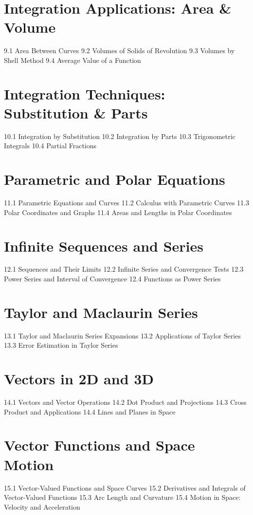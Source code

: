 \section{Integration Applications: Area \& Volume}
9.1 Area Between Curves
9.2 Volumes of Solids of Revolution
9.3 Volumes by Shell Method
9.4 Average Value of a Function
\section{Integration Techniques: Substitution \& Parts}
10.1 Integration by Substitution
10.2 Integration by Parts
10.3 Trigonometric Integrals
10.4 Partial Fractions
\section{Parametric and Polar Equations}
11.1 Parametric Equations and Curves
11.2 Calculus with Parametric Curves
11.3 Polar Coordinates and Graphs
11.4 Areas and Lengths in Polar Coordinates
\section{Infinite Sequences and Series}
12.1 Sequences and Their Limits
12.2 Infinite Series and Convergence Tests
12.3 Power Series and Interval of Convergence
12.4 Functions as Power Series
\section{Taylor and Maclaurin Series}
13.1 Taylor and Maclaurin Series Expansions
13.2 Applications of Taylor Series
13.3 Error Estimation in Taylor Series
\section{Vectors in 2D and 3D}
14.1 Vectors and Vector Operations
14.2 Dot Product and Projections
14.3 Cross Product and Applications
14.4 Lines and Planes in Space
\section{Vector Functions and Space Motion}
15.1 Vector-Valued Functions and Space Curves
15.2 Derivatives and Integrals of Vector-Valued Functions
15.3 Arc Length and Curvature
15.4 Motion in Space: Velocity and Acceleration
